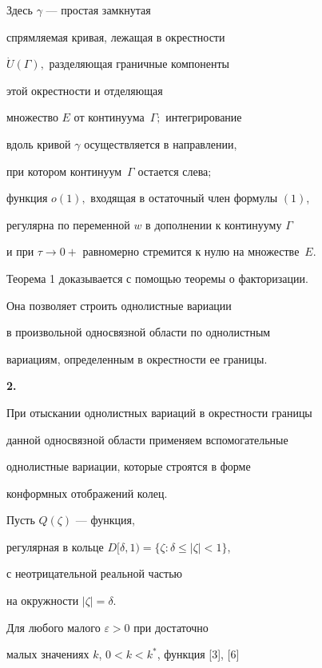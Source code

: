 \begin{thm}
\noindent{}Здесь $\gamma$ --- простая замкнутая 


спрямляемая кривая, лежащая в окрестности 


$\Dot{U}(\Gamma),$ разделяющая граничные компоненты


этой окрестности и отделяющая 


множество $E$ от континуума~$\Gamma;$ интегрирование


вдоль кривой $\gamma$ осуществляется в направлении, 


при котором континуум~$\Gamma$ остается слева$;$ 


функция $o(1),$ входящая в остаточный член формулы $(1)$,


регулярна по переменной $w$ в дополнении к континууму $\Gamma$


и при $\tau\to 0+$ равномерно стремится к нулю на множестве~$E$.


\end{thm}


\setcounter{footnote}{0}





Теорема 1 доказывается с помощью теоремы о факторизации.


Она позволяет строить однолистные вариации


в произвольной односвязной области по однолистным


вариациям, определенным в окрестности ее границы. 


\medskip





{\bf 2.}


При отыскании однолистных вариаций в окрестности границы


данной односвязной области применяем вспомогательные 


однолистные вариации, которые строятся в форме


конформных отображений колец. 





Пусть $Q(\zeta)$ --- функция, 


регулярная в кольце $D[\delta,1)=\{\zeta:\delta\le|\zeta|<1\}$, 


с неотрицательной реальной частью


на окружности $|\zeta|=\delta$.


Для любого малого $\varepsilon>0$ при достаточно 


малых значениях $k$, $0<k<k^{*}$, функция [3], [6]


